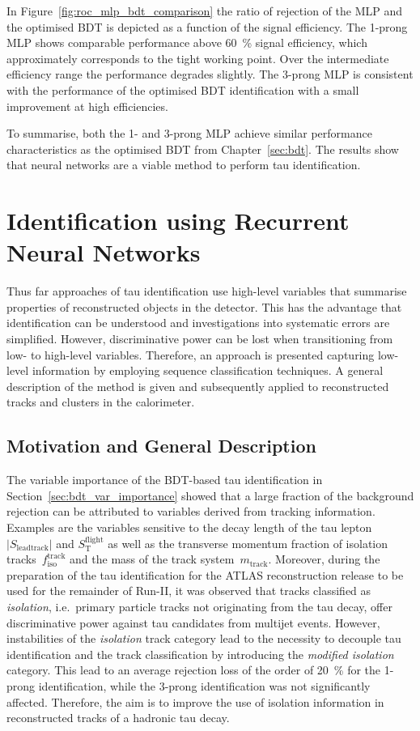 In Figure~\ref{fig:roc_mlp_bdt_comparison} the ratio of rejection of the MLP and
the optimised BDT is depicted as a function of the signal efficiency. The
1-prong MLP shows comparable performance above \SI{60}{\percent} signal
efficiency, which approximately corresponds to the tight working point. Over the
intermediate efficiency range the performance degrades slightly. The 3-prong MLP
is consistent with the performance of the optimised BDT identification with a
small improvement at high efficiencies.

To summarise, both the 1- and 3-prong MLP achieve similar performance
characteristics as the optimised BDT from Chapter~\ref{sec:bdt}. The results
show that neural networks are a viable method to perform tau identification.

\section{Identification using Recurrent Neural Networks}
\label{sec:rnn_id}

Thus far approaches of tau identification use high-level variables that
summarise properties of reconstructed objects in the detector. This has the
advantage that identification can be understood and investigations into
systematic errors are simplified. However, discriminative power can be lost when
transitioning from low- to high-level variables. Therefore, an approach is
presented capturing low-level information by employing sequence classification
techniques. A general description of the method is given and subsequently
applied to reconstructed tracks and clusters in the calorimeter.

\subsection{Motivation and General Description}
\label{sec:rnn_descr}

The variable importance of the BDT-based tau identification in
Section~\ref{sec:bdt_var_importance} showed that a large fraction of the
background rejection can be attributed to variables derived from tracking
information. Examples are the variables sensitive to the decay length of the tau
lepton~$|S_\text{leadtrack}|$ and $S_\text{T}^\text{flight}$ as well as the
transverse momentum fraction of isolation tracks~$f_\text{iso}^\text{track}$ and
the mass of the track system~$m_\text{track}$. Moreover, during the preparation
of the tau identification for the ATLAS reconstruction release to be used for
the remainder of Run-II, it was observed that tracks classified as
\emph{isolation}, i.e.\ primary particle tracks not originating from the tau
decay, offer discriminative power against tau candidates from multijet events.
However, instabilities of the \emph{isolation} track category lead to the
necessity to decouple tau identification and the track classification by
introducing the \emph{modified isolation} category. This lead to an average
rejection loss of the order of \SI{20}{\percent} for the 1-prong identification,
while the 3-prong identification was not significantly affected. Therefore, the
aim is to improve the use of isolation information in reconstructed tracks of a
hadronic tau decay.

